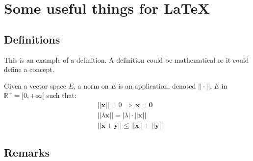 \documentclass[11pt]{book} %
\begin{document}

%



\iffalse



\chapter{Some useful things for LaTeX}




\section{Definitions}

This is an example of a definition. A definition could be mathematical or it could define a concept.

\begin{definition}
Given a vector space $E$, a norm on $E$ is an application, denoted $||\cdot||$, $E$ in $\mathbb{R}^+=[0,+\infty[$ such that:
\begin{align}
& ||\mathbf{x}||=0\ \Rightarrow\ \mathbf{x}=\mathbf{0}\\
& ||\lambda \mathbf{x}||=|\lambda|\cdot ||\mathbf{x}||\\
& ||\mathbf{x}+\mathbf{y}||\leq ||\mathbf{x}||+||\mathbf{y}||
\end{align}
\end{definition}


\section{Remarks}
\end{document}
